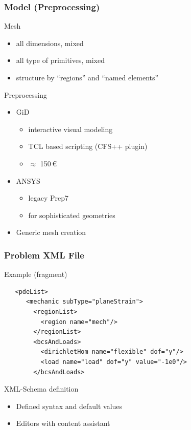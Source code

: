 \documentclass{beamer}
\begin{document}
\begin{frame}
\frametitle{Model (Preprocessing)}
Mesh
\begin{itemize}
  \item all dimensions, mixed
  \item all type of primitives, mixed
  \item structure by ``regions'' and ``named elements''
\end{itemize}
Preprocessing
\begin{itemize}
  \item GiD
  \begin{itemize}
    \item interactive visual modeling 
    \item TCL based scripting (CFS++ plugin)
    \item $\approx$ 150\,\euro
  \end{itemize}
  \item ANSYS
  \begin{itemize}
    \item legacy Prep7
    \item for sophisticated geometries
  \end{itemize}
  \item Generic mesh creation   
\end{itemize}
\end{frame}

\begin{frame}[containsverbatim]
\frametitle{Problem XML File}
Example (fragment)
\footnotesize\begin{verbatim}
   <pdeList>
      <mechanic subType="planeStrain">
        <regionList>
          <region name="mech"/>
        </regionList>
        <bcsAndLoads>
          <dirichletHom name="flexible" dof="y"/>
          <load name="load" dof="y" value="-1e0"/>
        </bcsAndLoads>
\end{verbatim}
\normalsize
XML-Schema definition
\begin{itemize}
  \item Defined syntax and default values
  \item Editors with content assistant 
\end{itemize}
\end{frame}
\end{document}
